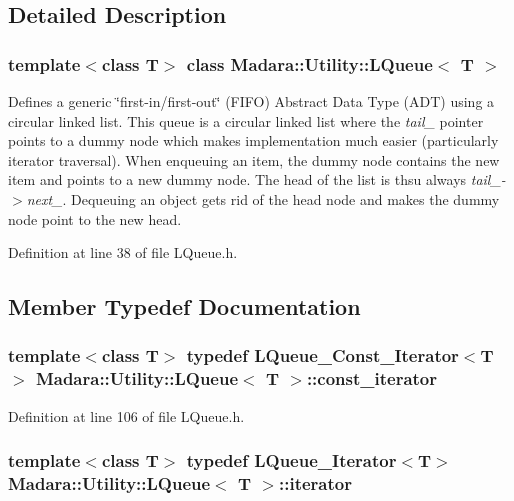 \subsection{Detailed Description}
\subsubsection*{template$<$class T$>$ class Madara::Utility::LQueue$<$ T $>$}

Defines a generic \char`\"{}first-\/in/first-\/out\char`\"{} (FIFO) Abstract Data Type (ADT) using a circular linked list. This queue is a circular linked list where the {\itshape tail\_\-\/} pointer points to a dummy node which makes implementation much easier (particularly iterator traversal). When enqueuing an item, the dummy node contains the new item and points to a new dummy node. The head of the list is thsu always {\itshape tail\_\--\/$>$next\_\-\/}. Dequeuing an object gets rid of the head node and makes the dummy node point to the new head. 

Definition at line 38 of file LQueue.h.



\subsection{Member Typedef Documentation}
\hypertarget{classMadara_1_1Utility_1_1LQueue_a716f1eb90f4f16f4a6df486e8613952c}{
\subsubsection[{const\_\-iterator}]{\setlength{\rightskip}{0pt plus 5cm}template$<$class T$>$ typedef {\bf LQueue\_\-Const\_\-Iterator}$<$T$>$ {\bf Madara::Utility::LQueue}$<$ T $>$::{\bf const\_\-iterator}}}
\label{d7/df8/classMadara_1_1Utility_1_1LQueue_a716f1eb90f4f16f4a6df486e8613952c}


Definition at line 106 of file LQueue.h.

\hypertarget{classMadara_1_1Utility_1_1LQueue_ae81897923a220c04feeea57192cf57bc}{
\subsubsection[{iterator}]{\setlength{\rightskip}{0pt plus 5cm}template$<$class T$>$ typedef {\bf LQueue\_\-Iterator}$<$T$>$ {\bf Madara::Utility::LQueue}$<$ T $>$::{\bf iterator}}}
\label{d7/df8/classMadara_1_1Utility_1_1LQueue_ae81897923a220c04feeea57192cf57bc}


